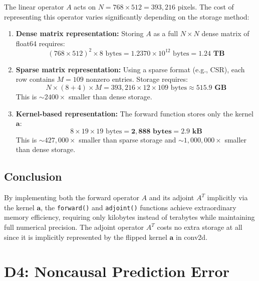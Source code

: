 \documentclass[12pt]{article}
\begin{document}
The linear operator $A$ acts on $N = 768 \times 512 = 393{,}216$ pixels. The cost of representing this operator varies significantly depending on the storage method:

\begin{enumerate}
    \item \textbf{Dense matrix representation:} Storing $A$ as a full $N \times N$ dense matrix of float64 requires:
    \begin{equation*}
        (768 \times 512)^2 \times 8 \text{ bytes} = 1.2370 \times 10^{12} \text{ bytes} = \mathbf{1.24 \text{ TB}}
    \end{equation*}

    \item \textbf{Sparse matrix representation:} Using a sparse format (e.g., CSR), each row contains $M = 109$ nonzero entries. Storage requires:
    \begin{equation*}
        N \times (8 + 4) \times M = 393{,}216 \times 12 \times 109 \text{ bytes} \approx \mathbf{515.9 \text{ GB}}
    \end{equation*}
    This is $\sim 2400 \times$ smaller than dense storage.

    \item \textbf{Kernel-based representation:} The forward function stores only the kernel $\mathbf{a}$:
    \begin{equation*}
        8 \times 19 \times 19 \text{ bytes} = \mathbf{2{,}888 \text{ bytes}} = \mathbf{2.9 \text{ kB}}
    \end{equation*}
    This is $\sim 427{,}000 \times$ smaller than sparse storage and $\sim 1{,}000{,}000 \times$ smaller than dense storage.
\end{enumerate}

\subsection*{Conclusion}

By implementing both the forward operator $A$ and its adjoint $A^T$ implicitly via the kernel $\mathbf{a}$, the \texttt{forward()} and \texttt{adjoint()} functions achieve extraordinary memory efficiency, requiring only kilobytes instead of terabytes while maintaining full numerical precision. The adjoint operator $A^T$ costs no extra storage at all since it is implicitly represented by the flipped kernel $\mathbf{a}$ in conv2d.

\section*{D4: Noncausal Prediction Error}
\end{document}
